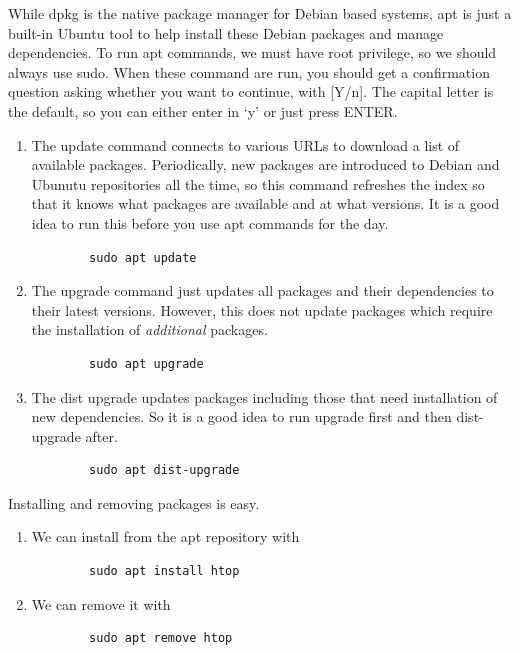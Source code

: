     While dpkg is the native package manager for Debian based systems, apt is just a built-in Ubuntu tool to help install these Debian packages and manage dependencies. To run apt commands, we must have root privilege, so we should always use sudo. When these command are run, you should get a confirmation question asking whether you want to continue, with [Y/n]. The capital letter is the default, so you can either enter in `y' or just press ENTER. 
    \begin{enumerate}
      \item The update command connects to various URLs to download a list of available packages. Periodically, new packages are introduced to Debian and Ubunutu repositories all the time, so this command refreshes the index so that it knows what packages are available and at what versions. It is a good idea to run this before you use apt commands for the day. 
      \begin{lstlisting}
        sudo apt update
      \end{lstlisting}

      \item The upgrade command just updates all packages and their dependencies to their latest versions. However, this does not update packages which require the installation of \textit{additional} packages. 
      \begin{lstlisting}
        sudo apt upgrade 
      \end{lstlisting}

      \item The dist upgrade updates packages including those that need installation of new dependencies. So it is a good idea to run upgrade first and then dist-upgrade after.  
      \begin{lstlisting}
        sudo apt dist-upgrade 
      \end{lstlisting}
    \end{enumerate}

    Installing and removing packages is easy. 

    \begin{enumerate}
      \item We can install from the apt repository with 
      \begin{lstlisting}
        sudo apt install htop
      \end{lstlisting}

      \item We can remove it with 
      \begin{lstlisting}
        sudo apt remove htop
      \end{lstlisting}
    \end{enumerate}


